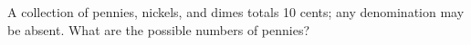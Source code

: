 A collection of pennies, nickels, and dimes totals 10 cents; any denomination may be absent. What are the possible numbers of pennies?
